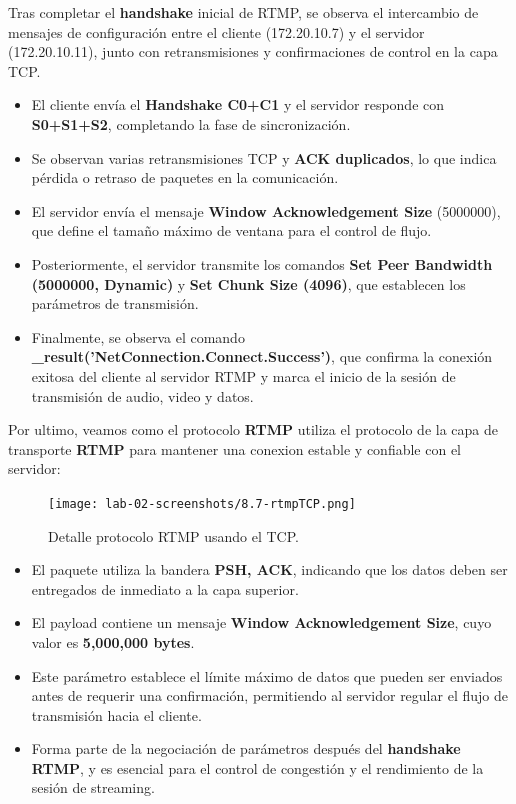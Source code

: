 \documentclass[10pt]{article}
\begin{document}
Tras completar el \textbf{handshake} inicial de RTMP, se observa el intercambio de mensajes de configuración entre el cliente (172.20.10.7) y el servidor (172.20.10.11), junto con retransmisiones y confirmaciones de control en la capa TCP.  

\begin{itemize}
    \item El cliente envía el \textbf{Handshake C0+C1} y el servidor responde con 
    \textbf{S0+S1+S2}, completando la fase de sincronización.
    \item Se observan varias retransmisiones TCP y \textbf{ACK duplicados}, lo que indica 
    pérdida o retraso de paquetes en la comunicación.
    \item El servidor envía el mensaje \textbf{Window Acknowledgement Size} (5000000), 
    que define el tamaño máximo de ventana para el control de flujo.
    \item Posteriormente, el servidor transmite los comandos 
    \textbf{Set Peer Bandwidth (5000000, Dynamic)} y 
    \textbf{Set Chunk Size (4096)}, que establecen los parámetros de transmisión.
    \item Finalmente, se observa el comando \textbf{\_result('NetConnection.Connect.Success')}, 
    que confirma la conexión exitosa del cliente al servidor RTMP y marca el inicio 
    de la sesión de transmisión de audio, video y datos.
\end{itemize}

Por ultimo, veamos como el protocolo \textbf{RTMP} utiliza el protocolo de la capa de transporte \textbf{RTMP} para mantener una conexion estable y confiable con el servidor:
\begin{figure}[H]
    \centering
    \texttt{[image: lab-02-screenshots/8.7-rtmpTCP.png]}
    \caption{Detalle protocolo RTMP usando el TCP.}
\end{figure}
\begin{itemize}
    \item El paquete utiliza la bandera \textbf{PSH, ACK}, indicando que 
    los datos deben ser entregados de inmediato a la capa superior.
    \item El payload contiene un mensaje \textbf{Window Acknowledgement Size}, 
    cuyo valor es \textbf{5,000,000 bytes}.
    \item Este parámetro establece el límite máximo de datos que pueden ser 
    enviados antes de requerir una confirmación, permitiendo al servidor 
    regular el flujo de transmisión hacia el cliente.
    \item Forma parte de la negociación de parámetros después del 
    \textbf{handshake RTMP}, y es esencial para el control de congestión 
    y el rendimiento de la sesión de streaming.
\end{itemize}
\end{document}
